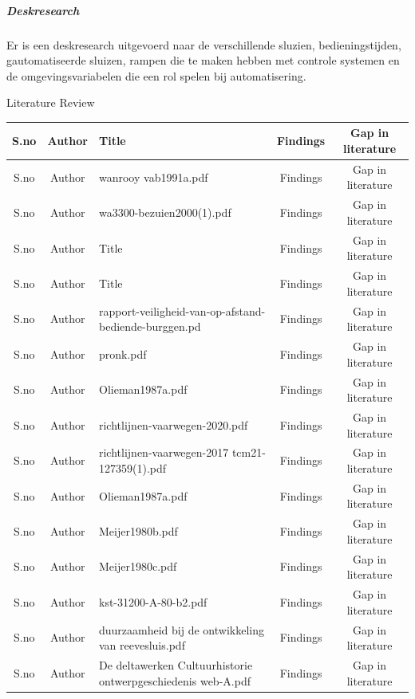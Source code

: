\documentclass[11pt]{report} %
\begin{document}
\subparagraph{Deskresearch}
Er is een deskresearch uitgevoerd naar de verschillende sluzien, bedieningstijden, gautomatiseerde sluizen, rampen die te maken hebben met controle systemen en de omgevingsvariabelen die een rol spelen bij automatisering.



\begin{frame}{Literature Review}
	\begin{table}[htbp]
		\footnotesize
		
		\centering
		\begin{tabular}{|c|c|p{2in}|c|c|}\hline
			S.no&Author&Title&Findings&Gap in literature\\\hline
			S.no&Author&wanrooy \textunderscore vab1991a.pdf&Findings&Gap in literature\\\hline
			S.no&Author&wa3300-bezuien2000(1).pdf&Findings&Gap in literature\\\hline
			S.no&Author&Title&Findings&Gap in literature\\\hline
			S.no&Author&Title&Findings&Gap in literature\\\hline
			S.no&Author&rapport-veiligheid-van-op-afstand-bediende-burggen.pd&Findings&Gap in literature\\\hline
			S.no&Author&pronk.pdf&Findings&Gap in literature\\\hline
			S.no&Author&Olieman1987a.pdf&Findings&Gap in literature\\\hline
			S.no&Author&richtlijnen-vaarwegen-2020.pdf&Findings&Gap in literature\\\hline
			S.no&Author&richtlijnen-vaarwegen-2017 \textunderscore tcm21-127359(1).pdf&Findings&Gap in literature\\\hline
			S.no&Author&Olieman1987a.pdf&Findings&Gap in literature\\\hline
			S.no&Author&Meijer1980b.pdf&Findings&Gap in literature\\\hline
			S.no&Author&Meijer1980c.pdf&Findings&Gap in literature\\\hline
			S.no&Author&kst-31200-A-80-b2.pdf&Findings&Gap in literature\\\hline
			S.no&Author&duurzaamheid \textunderscore bij \textunderscore de \textunderscore ontwikkeling \textunderscore van \textunderscore reevesluis.pdf&Findings&Gap in literature\\\hline
			S.no&Author&De \textunderscore deltawerken \textunderscore Cultuurhistorie \textunderscore ontwerpgeschiedenis \textunderscore web-A.pdf&Findings&Gap in literature\\\hline

\end{tabular}
\end{table}
\end{frame}
\end{document}
